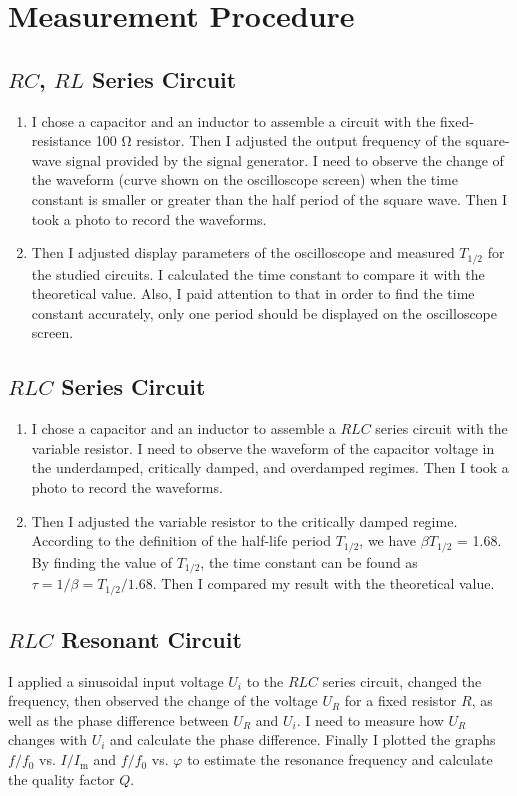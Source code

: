 \documentclass{article}
\begin{document}
\section{Measurement Procedure}

\subsection{$RC$, $RL$ Series Circuit}
\begin{enumerate}
    \item I chose a capacitor and an inductor to assemble a circuit with the fixed-resistance 100 Ω resistor. Then I adjusted the output frequency of the square-wave signal provided by the signal generator. I need to observe the change of the waveform (curve shown on the oscilloscope screen) when the time constant is smaller or greater than the half period of the square wave. Then I took a photo to record the waveforms.
    \item Then I adjusted display parameters of the oscilloscope and measured $T_{1/2}$ for the studied circuits. I calculated the time constant to compare it with the theoretical value. Also, I paid attention to that in order to find the time constant accurately, only one period should be displayed on the oscilloscope screen.
\end{enumerate}

\subsection{$RLC$ Series Circuit}
\begin{enumerate}
    \item I chose a capacitor and an inductor to assemble a $RLC$ series circuit with the variable resistor. I need to observe the waveform of the capacitor voltage in the underdamped, critically damped, and overdamped regimes. Then I took a photo to record the waveforms.
    \item Then I adjusted the variable resistor to the critically damped regime. According to the definition of the half-life period $T_{1/2}$, we have $\beta T_{1/2}$ = 1.68. By finding the value of $T_{1/2}$, the time constant can be found as $\tau = 1/\beta = T_{1/2}/1.68$. Then I compared my result with the theoretical value.
\end{enumerate}

\subsection{$RLC$ Resonant Circuit}
I applied a sinusoidal input voltage $U_i$ to the $RLC$ series circuit, changed the frequency, then observed the change of the voltage $U_R$ for a fixed resistor $R$, as well as the phase difference between $U_R$ and $U_i$. I need to measure how $U_R$ changes with $U_i$ and calculate the phase difference. Finally I plotted the graphs $f/f_0$ vs. $I/I_\text{m}$ and $f/f_0$ vs. $\varphi$ to estimate the resonance frequency and calculate the quality factor $Q$.
\end{document}
